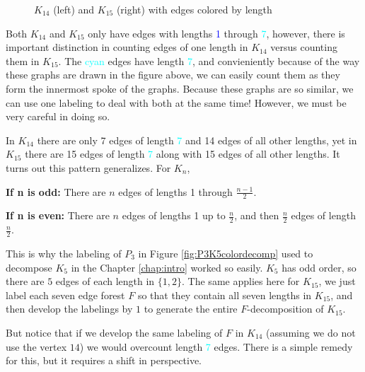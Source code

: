 \begin{figure}[H]
\begin{center}
\begin{tikzpicture}[scale=2]
            
    \end{tikzpicture}
    \end{center}
\caption{$K_{14}$ (left) and $K_{15}$ (right) with edges colored by length}
\label{fig:K14K15colored}
\end{figure}

Both $K_{14}$ and $K_{15}$ only have edges with lengths \textcolor{blue}{1} through \textcolor{cyan}{7}, however, there is important distinction in counting edges of one length in $K_{14}$ versus counting them in $K_{15}$. The \textcolor{cyan}{cyan} edges have length \textcolor{cyan}{7}, and convieniently because of the way these graphs are drawn in the figure above, we can easily count them as they form the innermost spoke of the graphs. Because these graphs are so similar, we can use one labeling to deal with both at the same time! However, we must be very careful in doing so.

In $K_{14}$ there are only 7 edges of length \textcolor{cyan}{7} and 14 edges of all other lengths, yet in $K_{15}$ there are 15 edges of length \textcolor{cyan}{7} along with 15 edges of all other lengths. It turns out this pattern generalizes. For $K_{n}$,

\textbf{If n is odd:} There are $n$ edges of lengths 1 through $\frac{n-1}{2}$.

\textbf{If n is even:} There are $n$ edges of lengths 1 up to $\frac{n}{2}$, and then $\frac{n}{2}$ edges of length $\frac{n}{2}.$

\noindent This is why the labeling of $P_{3}$ in Figure \ref{fig:P3K5colordecomp} used to decompose $K_{5}$ in the Chapter \ref{chap:intro} worked so easily. $K_{5}$ has odd order, so there are $5$ edges of each length in $\{1,2\}$. The same applies here for $K_{15}$, we just label each seven edge forest $F$ so that they contain all seven lengths in $K_{15}$, and then develop the labelings by $1$ to generate the entire $F$-decomposition of $K_{15}$. 

But notice that if we develop the same labeling of $F$ in $K_{14}$ (assuming we do not use the vertex $14$) we would overcount length \textcolor{cyan}{7} edges. There is a simple remedy for this, but it requires a shift in perspective.

